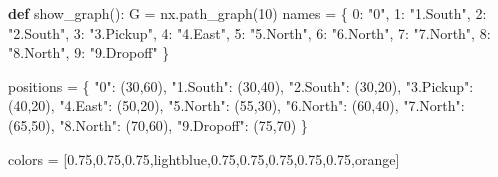 \documentclass[
  letterpaper,
]{scrbook}
\newenvironment{Shaded}{\begin{snugshade}}{\end{snugshade}}
\newcommand{\DecValTok}[1]{\textcolor[rgb]{0.68,0.00,0.00}{#1}}
\newcommand{\KeywordTok}[1]{\textcolor[rgb]{0.00,0.23,0.31}{\textbf{#1}}}
\newcommand{\NormalTok}[1]{\textcolor[rgb]{0.00,0.23,0.31}{#1}}
\newcommand{\OperatorTok}[1]{\textcolor[rgb]{0.37,0.37,0.37}{#1}}
\newcommand{\StringTok}[1]{\textcolor[rgb]{0.13,0.47,0.30}{#1}}
\begin{document}
\begin{Shaded}
\begin{Highlighting}[]
\KeywordTok{def}\NormalTok{ show\_graph():}
\NormalTok{    G }\OperatorTok{=}\NormalTok{ nx.path\_graph(}\DecValTok{10}\NormalTok{)}
\NormalTok{    names }\OperatorTok{=}\NormalTok{ \{}
        \DecValTok{0}\NormalTok{: }\StringTok{"0"}\NormalTok{,}
        \DecValTok{1}\NormalTok{: }\StringTok{"1.South"}\NormalTok{,}
        \DecValTok{2}\NormalTok{: }\StringTok{"2.South"}\NormalTok{,}
        \DecValTok{3}\NormalTok{: }\StringTok{"3.Pickup"}\NormalTok{,}
        \DecValTok{4}\NormalTok{: }\StringTok{"4.East"}\NormalTok{,}
        \DecValTok{5}\NormalTok{: }\StringTok{"5.North"}\NormalTok{,}
        \DecValTok{6}\NormalTok{: }\StringTok{"6.North"}\NormalTok{,}
        \DecValTok{7}\NormalTok{: }\StringTok{"7.North"}\NormalTok{,}
        \DecValTok{8}\NormalTok{: }\StringTok{"8.North"}\NormalTok{,}
        \DecValTok{9}\NormalTok{: }\StringTok{"9.Dropoff"}
\NormalTok{    \}}

\NormalTok{    positions }\OperatorTok{=}\NormalTok{ \{}
        \StringTok{"0"}\NormalTok{: (}\DecValTok{30}\NormalTok{,}\DecValTok{60}\NormalTok{),}
        \StringTok{"1.South"}\NormalTok{: (}\DecValTok{30}\NormalTok{,}\DecValTok{40}\NormalTok{),}
        \StringTok{"2.South"}\NormalTok{: (}\DecValTok{30}\NormalTok{,}\DecValTok{20}\NormalTok{),}
        \StringTok{"3.Pickup"}\NormalTok{: (}\DecValTok{40}\NormalTok{,}\DecValTok{20}\NormalTok{),}
        \StringTok{"4.East"}\NormalTok{: (}\DecValTok{50}\NormalTok{,}\DecValTok{20}\NormalTok{),}
        \StringTok{"5.North"}\NormalTok{: (}\DecValTok{55}\NormalTok{,}\DecValTok{30}\NormalTok{),}
        \StringTok{"6.North"}\NormalTok{: (}\DecValTok{60}\NormalTok{,}\DecValTok{40}\NormalTok{),}
        \StringTok{"7.North"}\NormalTok{: (}\DecValTok{65}\NormalTok{,}\DecValTok{50}\NormalTok{),}
        \StringTok{"8.North"}\NormalTok{: (}\DecValTok{70}\NormalTok{,}\DecValTok{60}\NormalTok{),}
        \StringTok{"9.Dropoff"}\NormalTok{: (}\DecValTok{75}\NormalTok{,}\DecValTok{70}\NormalTok{)}
\NormalTok{    \}}

\NormalTok{    colors }\OperatorTok{=}\NormalTok{ [}\StringTok{\textquotesingle{}0.75\textquotesingle{}}\NormalTok{,}\StringTok{\textquotesingle{}0.75\textquotesingle{}}\NormalTok{,}\StringTok{\textquotesingle{}0.75\textquotesingle{}}\NormalTok{,}\StringTok{\textquotesingle{}lightblue\textquotesingle{}}\NormalTok{,}\StringTok{\textquotesingle{}0.75\textquotesingle{}}\NormalTok{,}\StringTok{\textquotesingle{}0.75\textquotesingle{}}\NormalTok{,}\StringTok{\textquotesingle{}0.75\textquotesingle{}}\NormalTok{,}\StringTok{\textquotesingle{}0.75\textquotesingle{}}\NormalTok{,}\StringTok{\textquotesingle{}0.75\textquotesingle{}}\NormalTok{,}\StringTok{\textquotesingle{}orange\textquotesingle{}}\NormalTok{]}


\end{Highlighting}
\end{Shaded}
\end{document}
